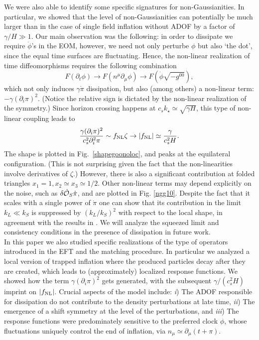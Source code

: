 \documentclass[11pt,amsmath,floats,floatfix,nofootinbib,secnumarabic, superscriptaddress, tightenlines]{revtex4}
\newcommand{\beq}{\begin{equation}}
\newcommand{\eeq}{\end{equation}}
\newcommand{\calo}{{\cal O}}
\begin{document}
{We were also able to identify some specific signatures for non-Gaussianities. In particular, we showed that the level of non-Gaussianities can potentially be much larger than in the case of single field inflation without ADOF by a factor of $\gamma/H \gg 1$. Our main observation was the following:
 in order to dissipate we require $\dot\phi$'s in the EOM, however, we need not only perturbe $\phi$ but also `the dot', since the equal time surfaces are fluctuating. Hence, the non-linear realization of time diffeomorphisms requires the following combination
 \beq F(\partial_t\phi) \to  F(n^\mu \partial_\mu \phi) \to F(\dot\phi \sqrt{-g^{00}}),\eeq
which not only induces $\gamma \dot\pi$ dissipation, but also (among others) a non-linear term: $-\gamma(\partial_i \pi)^2$. (Notice the relative sign is dictated by the non-linear realization of the symmetry.) Since horizon crossing happens at $c_s k_\star \simeq \sqrt{\gamma H}$, this type of non-linear coupling leads to \beq  \label{fnlconc} \frac{\gamma(\partial_i \pi)^2}{c_s^2\partial_i^2\pi} \sim f_{\rm NL}\zeta \to |f_{\rm NL}| \simeq \frac{\gamma}{c_s^2 H} .\eeq
The shape is plotted in Fig.~\ref{shapegoonoloc}, and peaks at the equilateral configuration. (This is not surprising given the fact that the
non-linearities involve derivatives of $\zeta$.) However, there is also a significant contribution at folded triangles  $x_1=1, x_2\simeq x_3\simeq 1/2$. Other non-linear terms may depend explicitly on the noise, such as $\delta\dot{\calo}_S \dot\pi$, and are plotted in Fig. \ref{ngg10}. Despite the fact that it scales with a single power of $\dot\pi$ one can show that its contribution in the limit $k_L \ll k_S$ is suppressed by $(k_L/k_S)^2$ with respect to the local shape, in agreement with the results in \cite{creminelli11}. We will analyze the squeezed limit and consistency conditions in the presence of dissipation in future work.\\

In this paper we also studied specific realizations of the type of operators introduced in the EFT and the matching procedure. In particular we analyzed a local version of trapped inflation where the produced particles decay after they are created, which leads to (approximately) localized response functions.  We showed how the term $\gamma (\partial_i \pi)^2$ gets generated, with the subsequent $\gamma/(c_s^2H)$ imprint on $|f_{\rm NL}|$. Crucial aspects of the model include: {\it i}) The ADOF responsible for dissipation do not contribute to the density perturbations at late time, {\it ii}) The emergence of a shift symmetry at the level of the perturbations, and {\it iii}) The response functions were predominately sensitive to the preferred clock $\phi$, whose fluctuations uniquely control the end of inflation, via $n_\mu \simeq \partial_\mu (t+\pi)$.

}
\end{document}
